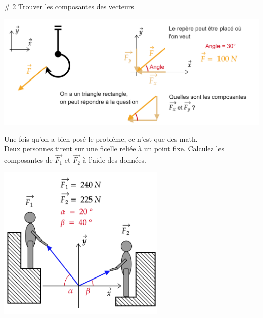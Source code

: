 \documentclass[12pt]{article}
\begin{document}
\begin{problem}{\# 2 Trouver les composantes des vecteurs}

        \begin{center}
            \includegraphics[width=1\textwidth]{DD11.png}
        \end{center}
    
    
Une fois qu'on a bien posé le problème, ce n'est que des math. \\

Deux personnes tirent sur une ficelle reliée à un point fixe. Calculez les composantes de $\Vec{F_1}$ et $\Vec{F_2}$ à l'aide des données.

        \begin{center}
            \includegraphics[width=0.6\textwidth]{DD12.png}
        \end{center}



\end{problem}
\end{document}

